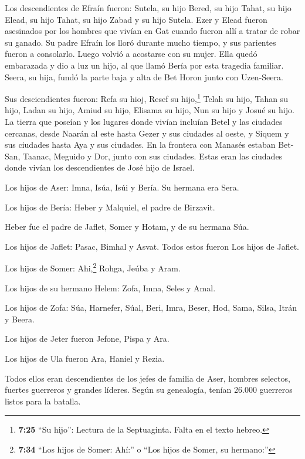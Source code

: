  Los descendientes de Efraín fueron: Sutela, su hijo Bered,
su hijo Tahat, su hijo Elead, su hijo Tahat,  su hijo Zabad
y su hijo Sutela. Ezer y Elead fueron asesinados por los hombres que
vivían en Gat cuando fueron allí a tratar de robar su ganado.
 Su padre Efraín los lloró durante mucho tiempo, y sus
parientes fueron a consolarlo.  Luego volvió a acostarse
con su mujer. Ella quedó embarazada y dio a luz un hijo, al que llamó
Bería por esta tragedia familiar.  Seera, su hija, fundó la
parte baja y alta de Bet Horon junto con Uzen-Seera.

 Sus desciendientes fueron: Refa su hioj, Resef su
hijo,\footnote{\textbf{7:25} ``Su hijo'': Lectura de la Septuaginta.
  Falta en el texto hebreo.} Telah su hijo, Tahan su hijo, 
Ladan su hijo, Amiud su hijo, Elisama su hijo,  Nun su hijo
y Josué su hijo.  La tierra que poseían y los lugares donde
vivían incluían Betel y las ciudades cercanas, desde Naarán al este
hasta Gezer y sus ciudades al oeste, y Siquem y sus ciudades hasta Aya y
sus ciudades.  En la frontera con Manasés estaban Bet-San,
Taanac, Meguido y Dor, junto con sus ciudades. Estas eran las ciudades
donde vivían los descendientes de José hijo de Israel.

 Los hijos de Aser: Imna, Isúa, Isúi y Bería. Su hermana
era Sera.

 Los hijos de Bería: Heber y Malquiel, el padre de
Birzavit.

 Heber fue el padre de Jaflet, Somer y Hotam, y de su
hermana Súa.

 Los hijos de Jaflet: Pasac, Bimhal y Asvat. Todos estos
fueron Los hijos de Jaflet.

 Los hijos de Somer: Ahi,\footnote{\textbf{7:34} ``Los
  hijos de Somer: Ahí:'' o ``Los hijos de Somer, su hermano:''} Rohga,
Jeúba y Aram.

 Los hijos de su hermano Helem: Zofa, Imna, Seles y Amal.

 Los hijos de Zofa: Súa, Harnefer, Súal, Beri, Imra,
 Beser, Hod, Sama, Silsa, Itrán y Beera.

 Los hijos de Jeter fueron Jefone, Pispa y Ara.

 Los hijos de Ula fueron Ara, Haniel y Rezia.

 Todos ellos eran descendientes de los jefes de familia de
Aser, hombres selectos, fuertes guerreros y grandes líderes. Según su
genealogía, tenían 26.000 guerreros listos para la batalla.


